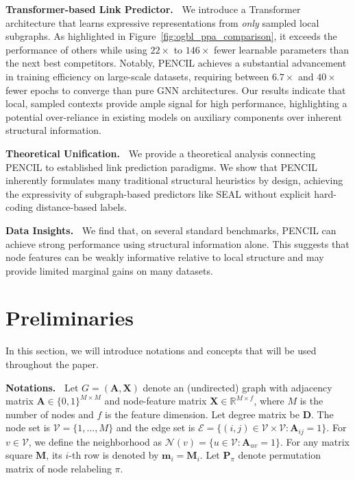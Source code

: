 \documentclass{article}
\theoremstyle{plain}
\theoremstyle{definition}
\theoremstyle{remark}
\begin{document}
\textbf{Transformer-based Link Predictor.~} We introduce a Transformer architecture that learns expressive representations from \emph{only} sampled local subgraphs. As highlighted in Figure~\ref{fig:ogbl_ppa_comparison}, it exceeds the performance of others while using $22\times$ to $146\times$ fewer learnable parameters than the next best competitors. Notably, PENCIL achieves a substantial advancement in training efficiency on large-scale datasets, requiring between $6.7\times$ and $40\times$ fewer epochs to converge than pure GNN architectures. Our results indicate that local, sampled contexts provide ample signal for high performance, highlighting a potential over-reliance in existing models on auxiliary components over inherent structural information.

\textbf{Theoretical Unification.~} We provide a theoretical analysis connecting PENCIL to established link prediction paradigms. We show that PENCIL inherently formulates many traditional structural heuristics by design, achieving the expressivity of subgraph-based predictors like SEAL \cite{zhang_link_2018} without explicit hard-coding distance-based labels.

\textbf{Data Insights.~} We find that, on several standard benchmarks, PENCIL can achieve strong performance using structural information alone. This suggests that node features can be weakly informative relative to local structure and may provide limited marginal gains on many datasets.

\section{Preliminaries} \label{sec:preliminaries}

In this section, we will introduce notations and concepts that will be used throughout the paper.

\textbf{Notations.~} Let $G=(\mathbf{A},\mathbf{X})$ denote an (undirected) graph with adjacency matrix $\mathbf{A}\in\{0,1\}^{M\times M}$ and node-feature matrix $\mathbf{X}\in\mathbb{R}^{M\times f}$, where \(M\) is the number of nodes and \(f\) is the feature dimension. Let degree matrix be $\mathbf{D}$. The node set is $\mathcal{V}=\{1,\ldots,M\}$ and the edge set is $\mathcal{E}=\{(i,j)\in\mathcal{V}\times\mathcal{V}:\mathbf{A}_{ij}=1\}$. For $v\in\mathcal{V}$, we define the neighborhood as $\mathcal{N}(v)=\{u\in\mathcal{V}:\mathbf{A}_{uv}=1\}$. For any matrix square $\mathbf{M}$, its $i$-th row is denoted by $\mathbf{m}_i=\mathbf{M}_i$. Let \(\mathbf{P}_\pi\) denote permutation matrix of node relabeling \(\pi\).
\end{document}
